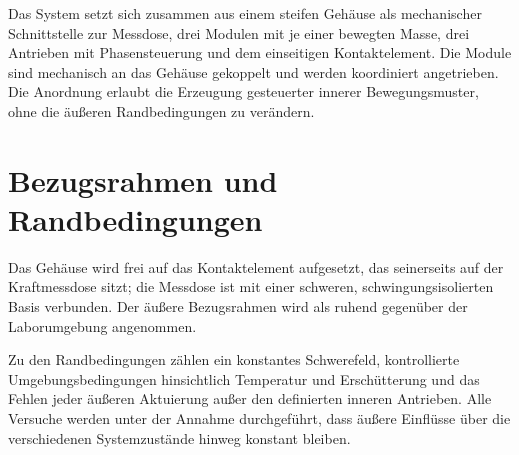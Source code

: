 \documentclass[12pt,a4paper]{report}
\begin{document}
\begin{table}[htbp]
  \centering
  \caption{Richtwerte des geplanten Aufbaus, Laborvariante 1. Die
  Antriebsfrequenz stimmt mit dem Simulationsparametersatz überein.}
  \label{tab:aufbau}
\end{table}

Das System setzt sich zusammen aus einem steifen Gehäuse als mechanischer
Schnittstelle zur Messdose, drei Modulen mit je einer bewegten Masse,
drei Antrieben mit Phasensteuerung und dem einseitigen Kontaktelement.
Die Module sind mechanisch an das Gehäuse gekoppelt und werden
koordiniert angetrieben. Die Anordnung erlaubt die Erzeugung gesteuerter
innerer Bewegungsmuster, ohne die äußeren Randbedingungen zu verändern.

\section{Bezugsrahmen und Randbedingungen}

Das Gehäuse wird frei auf das Kontaktelement aufgesetzt, das seinerseits
auf der Kraftmessdose sitzt; die Messdose ist mit einer schweren,
schwingungsisolierten Basis verbunden. Der äußere Bezugsrahmen wird als
ruhend gegenüber der Laborumgebung angenommen.

Zu den Randbedingungen zählen ein konstantes Schwerefeld, kontrollierte
Umgebungsbedingungen hinsichtlich Temperatur und Erschütterung und das
Fehlen jeder äußeren Aktuierung außer den definierten inneren
Antrieben. Alle Versuche werden unter der Annahme durchgeführt, dass
äußere Einflüsse über die verschiedenen Systemzustände hinweg konstant
bleiben.
\end{document}

